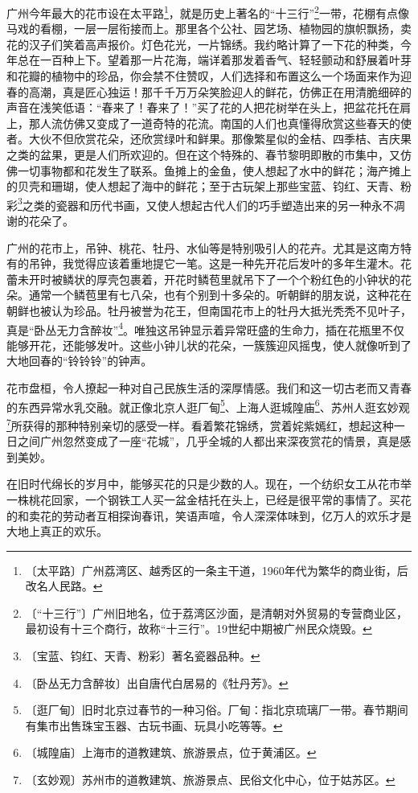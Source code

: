 \documentclass[12pt,UTF-8,openany]{ctexbook}
\begin{document}
\begin{large}
    广州今年最大的花市设在太平路\footnote{〔太平路〕广州荔湾区、越秀区的一条主干道，1960年代为繁华的商业街，后改名人民路。}，就是历史上著名的“十三行”\footnote{〔“十三行”〕广州旧地名，位于荔湾区沙面，是清朝对外贸易的专营商业区，最初设有十三个商行，故称“十三行”。19世纪中期被广州民众烧毁。}一带，花棚有点像马戏的看棚，一层一层衔接而上。那里各个公社、园艺场、植物园的旗帜飘扬，卖花的汉子们笑着高声报价。灯色花光，一片锦绣。我约略计算了一下花的种类，今年总在一百种上下。望着那一片花海，端详着那发着香气、轻轻颤动和舒展着叶芽和花瓣的植物中的珍品，你会禁不住赞叹，人们选择和布置这么一个场面来作为迎春的高潮，真是匠心独运！那千千万万朵笑脸迎人的鲜花，仿佛正在用清脆细碎的声音在浅笑低语：“春来了！春来了！”买了花的人把花树举在头上，把盆花托在肩上，那人流仿佛又变成了一道奇特的花流。南国的人们也真懂得欣赏这些春天的使者。大伙不但欣赏花朵，还欣赏绿叶和鲜果。那像繁星似的金桔、四季桔、吉庆果之类的盆果，更是人们所欢迎的。但在这个特殊的、春节黎明即散的市集中，又仿佛一切事物都和花发生了联系。鱼摊上的金鱼，使人想起了水中的鲜花；海产摊上的贝壳和珊瑚，使人想起了海中的鲜花；至于古玩架上那些宝蓝、钧红、天青、粉彩\footnote{〔宝蓝、钧红、天青、粉彩〕著名瓷器品种。}之类的瓷器和历代书画，又使人想起古代人们的巧手塑造出来的另一种永不凋谢的花朵了。
    
    广州的花市上，吊钟、桃花、牡丹、水仙等是特别吸引人的花卉。尤其是这南方特有的吊钟，我觉得应该着重地提它一笔。这是一种先开花后发叶的多年生灌木。花蕾未开时被鳞状的厚壳包裹着，开花时鳞苞里就吊下了一个个粉红色的小钟状的花朵。通常一个鳞苞里有七八朵，也有个别到十多朵的。听朝鲜的朋友说，这种花在朝鲜也被认为珍品。牡丹被誉为花王，但南国花市上的牡丹大抵光秃秃不见叶子，真是“卧丛无力含醉妆”\footnote{〔卧丛无力含醉妆〕出自唐代白居易的《牡丹芳》。}。唯独这吊钟显示着异常旺盛的生命力，插在花瓶里不仅能够开花，还能够发叶。这些小钟儿状的花朵，一簇簇迎风摇曳，使人就像听到了大地回春的“铃铃铃”的钟声。
    
    花市盘桓，令人撩起一种对自己民族生活的深厚情感。我们和这一切古老而又青春的东西异常水乳交融。就正像北京人逛厂甸\footnote{〔逛厂甸〕旧时北京过春节的一种习俗。厂甸：指北京琉璃厂一带。春节期间有集市出售珠宝玉器、古玩书画、玩具小吃等等。}、上海人逛城隍庙\footnote{〔城隍庙〕上海市的道教建筑、旅游景点，位于黄浦区。}、苏州人逛玄妙观\footnote{〔玄妙观〕苏州市的道教建筑、旅游景点、民俗文化中心，位于姑苏区。}所获得的那种特别亲切的感受一样。看着繁花锦绣，赏着姹紫嫣红，想起这种一日之间广州忽然变成了一座“花城”，几乎全城的人都出来深夜赏花的情景，真是感到美妙。
    
    在旧时代绵长的岁月中，能够买花的只是少数的人。现在，一个纺织女工从花市举一株桃花回家，一个钢铁工人买一盆金桔托在头上，已经是很平常的事情了。买花的和卖花的劳动者互相探询春讯，笑语声喧，令人深深体味到，亿万人的欢乐才是大地上真正的欢乐。
    

\end{large}
\end{document}
